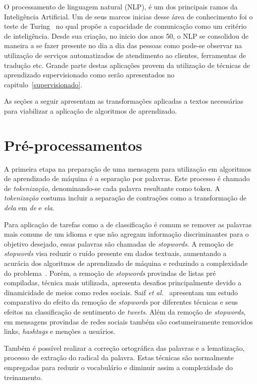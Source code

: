 O processamento de linguagem natural (NLP), é um dos principais ramos da Inteligência Artificial.
Um de seus marcos inicias desse área de conhecimento foi o teste de Turing~\cite{turing50} no qual propõe a capacidade
de comunicação como um critério de inteligência.
Desde sua criação, no inicio dos anos 50, o NLP se consolidou de maneira a se fazer presente no dia a dia das pessoas
como pode-se observar na utilização de serviços automatizados de atendimento ao clientes, ferramentas de tradução etc.
Grande parte destas aplicações provem da utilização de técnicas de aprendizado supervisionado como serão apresentados
no capitulo~\ref{supervisionado}.

As seções a seguir apresentam as transformações aplicadas a textos necessárias para viabilizar a aplicação de algoritmos
de aprendizado.

\section{Pré-processamentos}

A primeira etapa na preparação de uma mensagem para utilização em algoritmos de aprendizado de máquina é a separação por
palavras.
Este processo é chamado de \textit{tokenização}, denominando-se cada palavra resultante como token.
A \textit{tokenização} costuma incluir a separação de contrações como a transformação de \textit{dela} em \textit{de}
e \textit{ela}.


Para aplicação de tarefas como a de classificação é comum se remover as palavras mais comuns de um idioma e que não
agregam informação discriminantes para o objetivo desejado, essas palavras são chamadas de \textit{stopwords}.
A remoção de \textit{stopwords} visa reduzir o ruído presente em dados textuais, aumentando a acurácia dos algoritmos de
aprendizado de máquina e reduzindo a complexidade do problema~\cite{silva03}.
Porém, a remoção de \textit{stopwords} provindas de listas pré compiladas, técnica mais utilizada, apresenta desafios
principalmente devido a dinamicidade de meios como redes sociais.
Saif \textit{et al.}~\cite{saif14} apresentam um estudo comparativo do efeito da remoção de \textit{stopwords} por
diferentes técnicas e seus efeitos na classificação de sentimento de \textit{tweets}.
Além da remoção de \textit{stopwords}, em mensagens provindas de redes sociais também são costumeiramente removidos
links, \textit{hashtags} e menções a usuários.

Também é possível realizar a correção ortográfica das palavras e a lematização, processo de extração do radical da
palavra.
Estas técnicas são normalmente empregadas para reduzir o vocabulário e diminuir assim a complexidade do treinamento.

